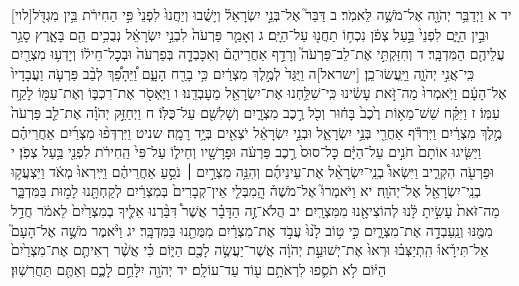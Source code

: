 \documentclass[twoside, openany, parskip=half, 11pt]{book}
\begin{document}
[לוי]יד א וַיְדַבֵּ֥ר יְהֹוָ֖ה אֶל־מֹשֶׁ֥ה לֵּאמֹֽר׃ ב דַּבֵּר֮ אֶל־בְּנֵ֣י יִשְׂרָאֵל֒ וְיָשֻׁ֗בוּ וְיַחֲנוּ֙ לִפְנֵי֙ פִּ֣י הַחִירֹ֔ת בֵּ֥ין מִגְדֹּ֖ל וּבֵ֣ין הַיָּ֑ם לִפְנֵי֙ בַּ֣עַל צְפֹ֔ן נִכְח֥וֹ תַחֲנ֖וּ עַל־הַיָּֽם׃ ג וְאָמַ֤ר פַּרְעֹה֙ לִבְנֵ֣י יִשְׂרָאֵ֔ל נְבֻכִ֥ים הֵ֖ם בָּאָ֑רֶץ סָגַ֥ר עֲלֵיהֶ֖ם הַמִּדְבָּֽר׃ ד וְחִזַּקְתִּ֣י אֶת־לֵב־פַּרְעֹה֮ וְרָדַ֣ף אַחֲרֵיהֶם֒ וְאִכָּבְדָ֤ה בְּפַרְעֹה֙ וּבְכׇל־חֵיל֔וֹ וְיָדְע֥וּ מִצְרַ֖יִם כִּֽי־אֲנִ֣י יְהֹוָ֑ה וַיַּֽעֲשׂוּ־כֵֽן׃ [ישראל]ה וַיֻּגַּד֙ לְמֶ֣לֶךְ מִצְרַ֔יִם כִּ֥י בָרַ֖ח הָעָ֑ם וַ֠יֵּהָפֵ֠ךְ לְבַ֨ב פַּרְעֹ֤ה וַעֲבָדָיו֙ אֶל־הָעָ֔ם וַיֹּֽאמְרוּ֙ מַה־זֹּ֣את עָשִׂ֔ינוּ כִּֽי־שִׁלַּ֥חְנוּ אֶת־יִשְׂרָאֵ֖ל מֵעָבְדֵֽנוּ׃ ו וַיֶּאְסֹ֖ר אֶת־רִכְבּ֑וֹ וְאֶת־עַמּ֖וֹ לָקַ֥ח עִמּֽוֹ׃ ז וַיִּקַּ֗ח שֵׁשׁ־מֵא֥וֹת רֶ֙כֶב֙ בָּח֔וּר וְכֹ֖ל רֶ֣כֶב מִצְרָ֑יִם וְשָׁלִשִׁ֖ם עַל־כֻּלּֽוֹ׃ ח וַיְחַזֵּ֣ק יְהֹוָ֗ה אֶת־לֵ֤ב פַּרְעֹה֙ מֶ֣לֶךְ מִצְרַ֔יִם וַיִּרְדֹּ֕ף אַחֲרֵ֖י בְּנֵ֣י יִשְׂרָאֵ֑ל וּבְנֵ֣י יִשְׂרָאֵ֔ל יֹצְאִ֖ים בְּיָ֥ד רָמָֽה׃ שניט וַיִּרְדְּפ֨וּ מִצְרַ֜יִם אַחֲרֵיהֶ֗ם וַיַּשִּׂ֤יגוּ אוֹתָם֙ חֹנִ֣ים עַל־הַיָּ֔ם כׇּל־סוּס֙ רֶ֣כֶב פַּרְעֹ֔ה וּפָרָשָׁ֖יו וְחֵיל֑וֹ עַל־פִּי֙ הַֽחִירֹ֔ת לִפְנֵ֖י בַּ֥עַל צְפֹֽן׃ י וּפַרְעֹ֖ה הִקְרִ֑יב וַיִּשְׂאוּ֩ בְנֵֽי־יִשְׂרָאֵ֨ל אֶת־עֵינֵיהֶ֜ם וְהִנֵּ֥ה מִצְרַ֣יִם ׀ נֹסֵ֣עַ אַחֲרֵיהֶ֗ם וַיִּֽירְאוּ֙ מְאֹ֔ד וַיִּצְעֲק֥וּ בְנֵֽי־יִשְׂרָאֵ֖ל אֶל־יְהֹוָֽה׃ יא וַיֹּאמְרוּ֮ אֶל־מֹשֶׁה֒ הֲֽמִבְּלִ֤י אֵין־קְבָרִים֙ בְּמִצְרַ֔יִם לְקַחְתָּ֖נוּ לָמ֣וּת בַּמִּדְבָּ֑ר מַה־זֹּאת֙ עָשִׂ֣יתָ לָּ֔נוּ לְהוֹצִיאָ֖נוּ מִמִּצְרָֽיִם׃ יב הֲלֹא־זֶ֣ה הַדָּבָ֗ר אֲשֶׁר֩ דִּבַּ֨רְנוּ אֵלֶ֤יךָ בְמִצְרַ֙יִם֙ לֵאמֹ֔ר חֲדַ֥ל מִמֶּ֖נּוּ וְנַֽעַבְדָ֣ה אֶת־מִצְרָ֑יִם כִּ֣י ט֥וֹב לָ֙נוּ֙ עֲבֹ֣ד אֶת־מִצְרַ֔יִם מִמֻּתֵ֖נוּ בַּמִּדְבָּֽר׃ יג וַיֹּ֨אמֶר מֹשֶׁ֣ה אֶל־הָעָם֮ אַל־תִּירָ֒אוּ֒ הִֽתְיַצְּב֗וּ וּרְאוּ֙ אֶת־יְשׁוּעַ֣ת יְהֹוָ֔ה אֲשֶׁר־יַעֲשֶׂ֥ה לָכֶ֖ם הַיּ֑וֹם כִּ֗י אֲשֶׁ֨ר רְאִיתֶ֤ם אֶת־מִצְרַ֙יִם֙ הַיּ֔וֹם לֹ֥א תֹסִ֛פוּ לִרְאֹתָ֥ם ע֖וֹד עַד־עוֹלָֽם׃ יד יְהֹוָ֖ה יִלָּחֵ֣ם לָכֶ֑ם וְאַתֶּ֖ם תַּחֲרִשֽׁוּן׃
\end{document}
